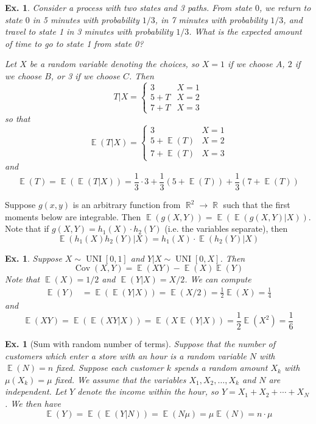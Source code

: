 \documentclass[12pt, a4paper]{book}
\DeclareMathOperator{\R}{\mathbb{R}}
\DeclareMathOperator{\E}{\mathbb{E}}
\DeclareMathOperator{\UNI}{UNI}
\DeclareMathOperator{\Cov}{Cov}
\newtheorem{example}[theorem]{Ex.}
\theoremstyle{nonumberplain}
\begin{document}
\begin{example}
    Consider a process with two states and 3 paths.
    From state $0$, we return to state $0$ in 5 minutes with probability $1/3$, in 7 minutes with probability $1/3$, and travel to state 1 in 3 minutes with probability $1/3$.
    What is the expected amount of time to go to state 1 from state 0?

    Let $X$ be a random variable denoting the choices, so $X=1$ if we choose $A$, $2$ if we choose $B$, or 3 if we choose $C$.
    Then
    \[T|X=
        \begin{cases}
            3 &X=1\\
            5+T&X=2\\
            7+T&X=3
        \end{cases}
    \]
    so that
    \[\E(T|X)=
        \begin{cases}
            3 & X=1\\
            5+\E(T) & X=2\\
            7+\E(T) & X=3
        \end{cases}
    \]
    and
    \[\E(T)=\E(\E(T|X))=\frac{1}{3}\cdot 3+\frac{1}{3}(5+\E(T))+\frac{1}{3}(7+\E(T))\]
\end{example}
Suppose $g(x,y)$ is an arbitrary function from $\R^2\to\R$ such that the first moments below are integrable.
Then $\E(g(X,Y))=\E(\E(g(X,Y)|X))$.
Note that if $g(X,Y)=h_1(X)\cdot h_2(Y)$ (i.e. the variables separate), then
\[\E(h_1(X)h_2(Y)|X)=h_1(X)\cdot\E(h_2(Y)|X)\]
\begin{example}
    Suppose $X\sim\UNI[0,1]$ and $Y|X\sim\UNI[0,X]$.
    Then
    \[\Cov(X,Y)=\E(XY)-\E(X)\E(Y)\]
    Note that $\E(X)=1/2$ and $\E(Y|X)=X/2$.
    We can compute
    \begin{align*}\E(Y) &= \E(\E(Y|X))=\E(X/2)=\frac{1}{2}\E(X)=\frac{1}{4}\end{align*}
    and
    \[\E(XY)=\E(\E(XY|X))=\E(X\E(Y|X))=\frac{1}{2}\E(X^2)=\frac{1}{6}\]
\end{example}
\begin{example}[Sum with random number of terms]
    Suppose that the number of customers which enter a store with an hour is a random variable $N$ with $\E(N)=n$ fixed.
    Suppose each customer $k$ spends a random amount $X_k$ with $\mu(X_k)=\mu$ fixed.
    We assume that the variables $X_1,X_2,\ldots,X_k$ and $N$ are independent.
    Let $Y$ denote the income within the hour, so $Y=X_1+X_2+\cdots+X_N$.
    We then have
    \[\E(Y)=\E(\E(Y|N))=\E(N\mu)=\mu\E(N)=n\cdot\mu\]
\end{example}
\end{document}
